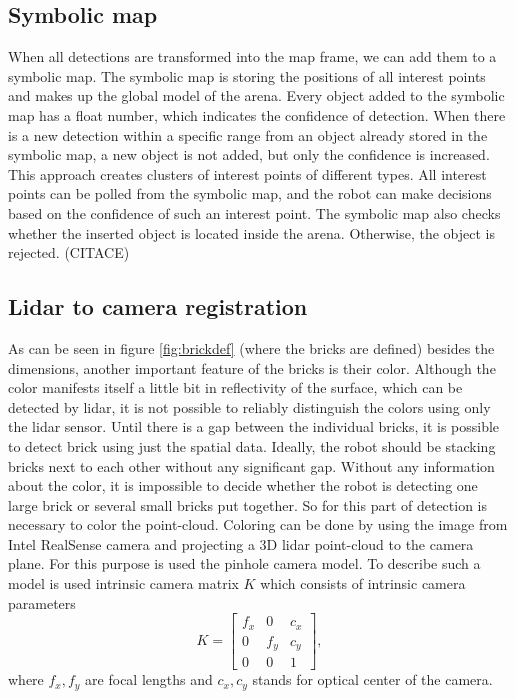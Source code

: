 \subsection{Symbolic map}
When all detections are transformed into the map frame, we can add them to a symbolic map. The symbolic map is storing the positions of all interest points and makes up the global model of the arena. Every object added to the symbolic map has a float number, which indicates the confidence of detection. When there is a new detection within a specific range from an object already stored in the symbolic map, a new object is not added, but only the confidence is increased. This approach creates clusters of interest points of different types. All interest points can be polled from the symbolic map, and the robot can make decisions based on the confidence of such an interest point. The symbolic map also checks whether the inserted object is located inside the arena. Otherwise, the object is rejected. (CITACE)

\subsection{Lidar to camera registration}
As can be seen in figure \ref{fig:brickdef} (where the bricks are defined) besides the dimensions, another important feature of the bricks is their color. Although the color manifests itself a little bit in reflectivity of the surface, which can be detected by lidar, it is not possible to reliably distinguish the colors using only the lidar sensor. Until there is a gap between the individual bricks, it is possible to detect brick using just the spatial data. Ideally, the robot should be stacking bricks next to each other without any significant gap. Without any information about the color, it is impossible to decide whether the robot is detecting one large brick or several small bricks put together. So for this part of detection is necessary to color the point-cloud. Coloring can be done by using the image from Intel RealSense camera and projecting a 3D lidar point-cloud to the camera plane. For this purpose is used the pinhole camera model. To describe such a model is used intrinsic camera matrix $K$ which consists of intrinsic camera parameters \cite{hartley2017}
\begin{equation}
K = \begin{bmatrix}
f_x & 0 & c_x \\
0 & f_y & c_y \\
0 & 0 & 1
\end{bmatrix},
\end{equation}
where $f_x, f_y$ are focal lengths and $c_x, c_y$ stands for optical center of the camera.

